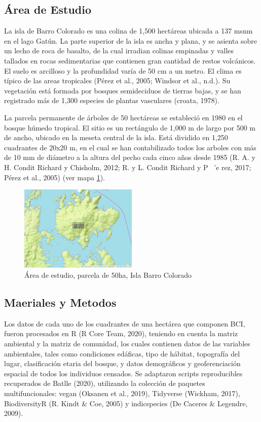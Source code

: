 \documentclass[11pt,]{article}
\begin{document}
\subsection{Área de Estudio}\label{uxe1rea-de-estudio}

La isla de Barro Colorado es una colina de 1,500 hectáreas ubicada a 137
msnm en el lago Gatún. La parte superior de la isla es ancha y plana, y
se asienta sobre un lecho de roca de basalto, de la cual irradian
colinas empinadas y valles tallados en rocas sedimentarias que contienen
gran cantidad de restos volcánicos. El suelo es arcilloso y la
profundidad varía de 50 cm a un metro. El clima es típico de las areas
tropicales (Pérez et al., 2005; Windsor et al., n.d.). Su vegetación
está formada por bosques semideciduos de tierras bajas, y se han
registrado más de 1,300 especies de plantas vasculares (croata, 1978).

La parcela permanente de árboles de 50 hectáreas se estableció en 1980
en el bosque húmedo tropical. El sitio es un rectángulo de 1,000 m de
largo por 500 m de ancho, ubicado en la meseta central de la isla. Está
dividido en 1,250 cuadrantes de 20x20 m, en el cual se han contabilizado
todos los arboles con más de 10 mm de diámetro a la altura del pecho
cada cinco años desde 1985 (R. A. y H. Condit Richard y Chisholm, 2012;
R. y L. Condit Richard y P ~'e rez, 2017; Pérez et al., 2005) (ver mapa
\ref{fig:Mapa}).

\begin{figure}
\centering
\includegraphics[width=0.50000\textwidth]{Mapa .png}
\caption{Área de estudio, parcela de 50ha, Isla Barro Colorado
\label{fig:Mapa}}
\end{figure}

\subsection{Maeriales y Metodos}\label{maeriales-y-metodos}

Los datos de cada uno de los cuadrantes de una hectárea que componen
BCI, fueron procesados en R (R Core Team, 2020), teniendo en cuenta la
matriz ambiental y la matriz de comunidad, los cuales contienen datos de
las variables ambientales, tales como condiciones edáficas, tipo de
hábitat, topografía del lugar, clasificación etaria del bosque, y datos
demográficos y geoferenciación espacial de todos los individuos
censados. Se adaptaron scripts reproducibles recuperados de Batlle
(2020), utilizando la colección de paquetes multifuncionales: vegan
(Oksanen et al., 2019), Tidyverse (Wickham, 2017), BiodiversityR (R.
Kindt \& Coe, 2005) y indicspecies (De Caceres \& Legendre, 2009).
\end{document}
